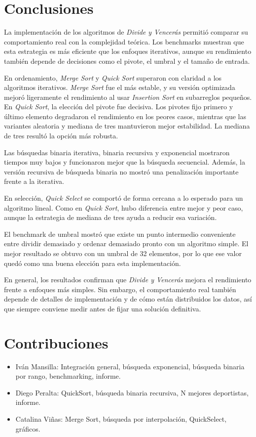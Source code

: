 \chapter{Conclusiones}

La implementación de los algoritmos de \textit{Divide y Vencerás} permitió comparar su comportamiento real con la complejidad teórica. Los benchmarks muestran que esta estrategia es más eficiente que los enfoques iterativos, aunque su rendimiento también depende de decisiones como el pivote, el umbral y el tamaño de entrada.

En ordenamiento, \textit{Merge Sort} y \textit{Quick Sort} superaron con claridad a los algoritmos iterativos. \textit{Merge Sort} fue el más estable, y su versión optimizada mejoró ligeramente el rendimiento al usar \textit{Insertion Sort} en subarreglos pequeños.
En \textit{Quick Sort}, la elección del pivote fue decisiva. Los pivotes fijo primero y último elemento degradaron el rendimiento en los peores casos, mientras que las variantes aleatoria y mediana de tres mantuvieron mejor estabilidad. La mediana de tres resultó la opción más robusta.

Las búsquedas binaria iterativa, binaria recursiva y exponencial mostraron tiempos muy bajos y funcionaron mejor que la búsqueda secuencial. Además, la versión recursiva de búsqueda binaria no mostró una penalización importante frente a la iterativa.

En selección, \textit{Quick Select} se comportó de forma cercana a lo esperado para un algoritmo lineal. Como en \textit{Quick Sort}, hubo diferencia entre mejor y peor caso, aunque la estrategia de mediana de tres ayuda a reducir esa variación.

El benchmark de umbral mostró que existe un punto intermedio conveniente entre dividir demasiado y ordenar demasiado pronto con un algoritmo simple. El mejor resultado se obtuvo con un umbral de 32 elementos, por lo que ese valor quedó como una buena elección para esta implementación.

En general, los resultados confirman que \textit{Divide y Vencerás} mejora el rendimiento frente a enfoques más simples. Sin embargo, el comportamiento real también depende de detalles de implementación y de cómo están distribuidos los datos, así que siempre conviene medir antes de fijar una solución definitiva.

\chapter{Contribuciones}

\begin{itemize}
    \item Iván Mansilla: Integración general, búsqueda exponencial, búsqueda binaria por rango, benchmarking, informe.
    \item Diego Peralta: QuickSort, búsqueda binaria recursiva, N mejores deportistas, informe.
    \item Catalina Viñas: Merge Sort, búsqueda por interpolación, QuickSelect, gráficos.
\end{itemize}


